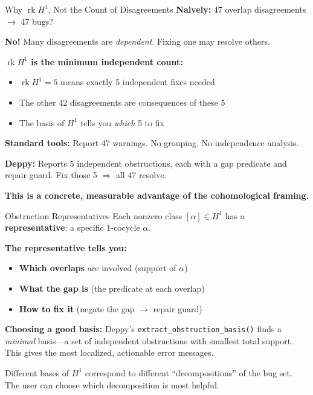 \documentclass[aspectratio=169,10pt]{beamer}
\newcommand{\rk}{\operatorname{rk}}
\begin{document}
\begin{frame}{Why $\rk H^1$, Not the Count of Disagreements}
\textbf{Naively:} 47 overlap disagreements $\to$ 47 bugs?

\textbf{No!} Many disagreements are \emph{dependent}. Fixing one may resolve others.

\vspace{0.3em}
\textbf{$\rk H^1$ is the minimum independent count:}
\begin{itemize}
  \item $\rk H^1 = 5$ means exactly 5 independent fixes needed
  \item The other 42 disagreements are consequences of these 5
  \item The basis of $H^1$ tells you \emph{which} 5 to fix
\end{itemize}

\vspace{0.5em}
\textbf{Standard tools:} Report 47 warnings. No grouping. No independence analysis.

\textbf{Deppy:} Reports 5 independent obstructions, each with a gap predicate and repair guard. Fix those 5 $\Rightarrow$ all 47 resolve.

\textbf{This is a concrete, measurable advantage of the cohomological framing.}
\end{frame}

\begin{frame}{Obstruction Representatives}
Each nonzero class $[\alpha] \in H^1$ has a \textbf{representative}: a specific 1-cocycle $\alpha$.

\textbf{The representative tells you:}
\begin{itemize}
  \item \textbf{Which overlaps} are involved (support of $\alpha$)
  \item \textbf{What the gap is} (the predicate at each overlap)
  \item \textbf{How to fix it} (negate the gap $\to$ repair guard)
\end{itemize}

\vspace{0.3em}
\textbf{Choosing a good basis:} Deppy's \texttt{extract\_obstruction\_basis()} finds a \emph{minimal} basis---a set of independent obstructions with smallest total support. This gives the most localized, actionable error messages.

\vspace{0.3em}
Different bases of $H^1$ correspond to different ``decompositions'' of the bug set. The user can choose which decomposition is most helpful.
\end{frame}
\end{document}
